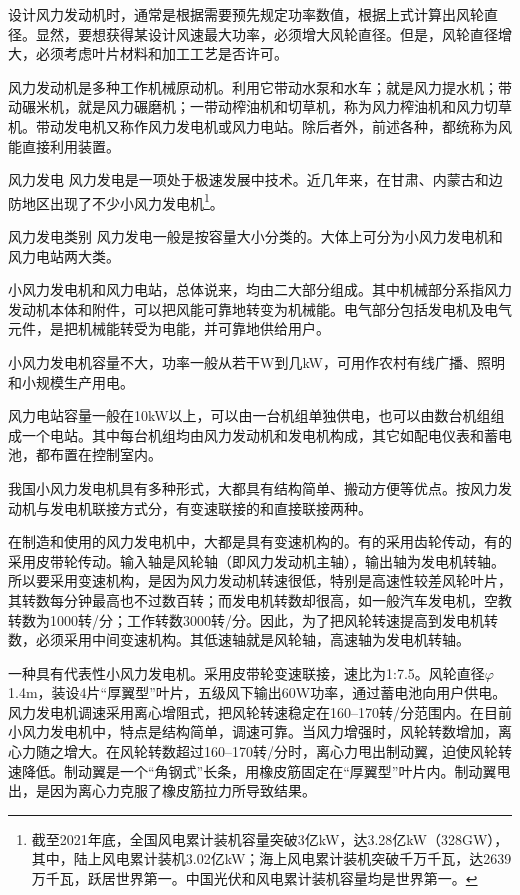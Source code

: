 \documentclass{ctexbook}
\begin{document}
设计风力发动机时，通常是根据需要预先规定功率数值，根据上式计算出风轮直径。显然，要想获得某设计风速最大功率，必须增大风轮直径。但是，风轮直径增大，必须考虑叶片材料和加工工艺是否许可。

风力发动机是多种工作机械原动机。利用它带动水泵和水车；就是风力提水机；带动碾米机，就是风力碾磨机；一带动榨油机和切草机，称为风力榨油机和风力切草机。带动发电机又称作风力发电机或风力电站。除后者外，前述各种，都统称为风能直接利用装置。

风力发电
风力发电是一项处于极速发展中技术。近几年来，在甘肃、内蒙古和边防地区出现了不少小风力发电机\footnote{截至2021年底，全国风电累计装机容量突破3亿kW，达3.28亿kW（328GW），其中，陆上风电累计装机3.02亿kW；海上风电累计装机突破千万千瓦，达2639万千瓦，跃居世界第一。中国光伏和风电累计装机容量均是世界第一。}。

风力发电类别
风力发电一般是按容量大小分类的。大体上可分为小风力发电机和风力电站两大类。

小风力发电机和风力电站，总体说来，均由二大部分组成。其中机械部分系指风力发动机本体和附件，可以把风能可靠地转变为机械能。电气部分包括发电机及电气元件，是把机械能转受为电能，并可靠地供给用户。

小风力发电机容量不大，功率一般从若干W到几kW，可用作农村有线广播、照明和小规模生产用电。
	
风力电站容量一般在10kW以上，可以由一台机组单独供电，也可以由数台机组组成一个电站。其中每台机组均由风力发动机和发电机构成，其它如配电仪表和蓄电池，都布置在控制室内。

我国小风力发电机具有多种形式，大都具有结构简单、搬动方便等优点。按风力发动机与发电机联接方式分，有变速联接的和直接联接两种。

在制造和使用的风力发电机中，大都是具有变速机构的。有的采用齿轮传动，有的采用皮带轮传动。输入轴是风轮轴（即风力发动机主轴），输出轴为发电机转轴。所以要采用变速机构，是因为风力发动机转速很低，特别是高速性较差风轮叶片，其转数每分钟最高也不过数百转；而发电机转数却很高，如一般汽车发电机，空教转数为1000转/分；工作转数3000转/分。因此，为了把风轮转速提高到发电机转数，必须采用中间变速机构。其低速轴就是风轮轴，高速轴为发电机转轴。

一种具有代表性小风力发电机。采用皮带轮变速联接，速比为1:7.5。风轮直径$\varphi$1.4m，装设4片“厚翼型”叶片，五级风下输出60W功率，通过蓄电池向用户供电。风力发电机调速采用离心增阻式，把风轮转速稳定在160--170转/分范围内。在目前小风力发电机中，特点是结构简单，调速可靠。当风力增强时，风轮转数增加，离心力随之增大。在风轮转数超过160--170转/分时，离心力甩出制动翼，迫使风轮转速降低。制动翼是一个“角钢式”长条，用橡皮筋固定在“厚翼型”叶片内。制动翼甩出，是因为离心力克服了橡皮筋拉力所导致结果。
\end{document}
